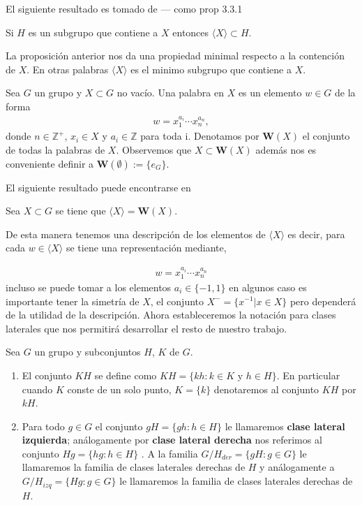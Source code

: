 El siguiente resultado es tomado de --- como prop 3.3.1
\begin{pr}
Si $H$ es un subgrupo que contiene a $X$ entonces $\langle X \rangle \subset H$.
\end{pr}
La proposición anterior nos da una propiedad minimal respecto a la contención de $X$. En otras palabras	$\langle X \rangle$ es el minimo subgrupo que contiene a $X$.

\begin{df}
Sea $G$ un  grupo y $X \subset G$ no vacío. Una palabra en $X$ es un elemento $w \in G$ de la forma
\begin{align*}
w=x_1^{a_i} \cdots x_n^{a_n},
\end{align*}
donde $n \in \mathbb{Z}^+$, $x_i \in X$ y $a_i \in \mathbb{Z}$ para toda i. Denotamos por $\mathbf{W}(X)$ el conjunto de todas la palabras de  $X$. Observemos que $X \subset \mathbf{W}(X)$ además nos es conveniente definir a $\mathbf{W}(\emptyset) :=\{e_G\}$.
\end{df}
El siguiente resultado puede encontrarse en %

\begin{te}
Sea $X \subset G$ se tiene que $\langle X \rangle= \mathbf{W}(X)$.
\end{te}
De esta manera tenemos una descripción de los elementos de $\langle X \rangle$ es decir, para cada $w \in \langle X \rangle$ se tiene una representación mediante, 

\begin{align*}
w=x_1^{a_i} \cdots x_n^{a_n}
\end{align*}
incluso se puede tomar a los elementos $a_i \in \{-1,1\}$ en algunos caso es importante tener la simetría de $X$, el conjunto $X^-=\{x^{-1}| x \in X \}$ pero dependerá de la utilidad de la descripción. Ahora estableceremos la notación para clases laterales que nos permitirá desarrollar el resto de nuestro trabajo. 	
	
\begin{df}
Sea $G$ un grupo y subconjuntos $H$, $K$ de $G$.
\begin{enumerate}
		
		\item El conjunto $KH$ se define como  $KH=\{kh: k \in K \text{ y } h \in H \}$. En particular cuando $K$ conste de un solo punto, $K=\{k\}$ denotaremos al conjunto $KH$ por $kH$.	
		
		\item Para todo $g \in G$ el conjunto $gH=\{gh:h \in H \}$ le llamaremos \textbf{clase lateral izquierda}; análogamente por \textbf{clase lateral derecha} nos referimos al conjunto $Hg=\{hg:h \in H\}$ . A la familia  $G/H_{der}=\{gH:g \in G\}$
le llamaremos la familia de clases laterales derechas de $H$ y análogamente a $G/H_{izq}=\{Hg:g \in G\}$
le llamaremos la familia de clases laterales derechas de $H$. 
	\end{enumerate} 
\end{df}	
	

